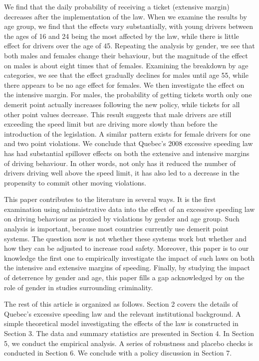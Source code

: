 We find that the daily probability of receiving a ticket (extensive margin) decreases after the implementation of the law. When we examine the results by age group, we find that the effects vary substantially, with young drivers between the ages of 16 and 24 being the most affected by the law, while there is little effect for drivers over the age of 45. Repeating the analysis by gender, we see that both males and females change their behaviour, but the magnitude of the effect on males is about eight times that of females. Examining the breakdown by age categories, we see that the effect gradually declines for males until age 55, while there appears to be no age effect for females. 
We then investigate the effect on the intensive margin. For males, the probability of getting tickets worth only one demerit point actually increases following the new policy, while tickets for all other point values decrease. This result suggests that male drivers are still exceeding the speed limit but are driving more slowly than before the introduction of the legislation. A similar pattern exists for female drivers for one and two point violations. We conclude that Quebec’s 2008 excessive speeding law has had substantial spillover effects on both the extensive and intensive margins of driving behaviour. In other words, not only has it reduced the number of drivers driving well above the speed limit, it has also led to a decrease in the propensity to commit other moving violations.

This paper contributes to the literature in several ways. It is the first examination using administrative data into the effect of an excessive speeding law on driving behaviour as proxied by violations by gender and age group. Such analysis is important, because most countries currently use demerit point systems. The question now is not whether these systems work but whether and how they can be adjusted to increase road safety. Moreover, this paper is to our knowledge the first one to empirically investigate the impact of such laws on both the intensive and extensive margins of speeding. Finally, by studying the impact of deterrence by gender and age, this paper fills a gap acknowledged by 
\citet{freeman1999}
on the role of gender in studies surrounding criminality.

The rest of this article is organized as follows. Section 2 covers the details of Quebec’s excessive speeding law and the relevant institutional background. A simple theoretical model investigating the effects of the law is constructed in Section 3. The data and summary statistics are presented in Section 4. In Section 5, we conduct the empirical analysis. A series of robustness and placebo checks is conducted in Section 6. We conclude with a policy discussion in Section 7.
